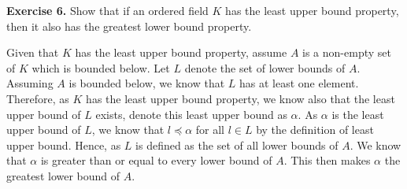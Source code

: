 \documentclass[11pt, leqno]{article}
\begin{document}
\vspace{1pc}

\textbf{Exercise 6.} Show that if an ordered field $K$ has the least upper bound property, then it also has the greatest lower bound property.

\vspace{1pc}

Given that $K$ has the least upper bound property, assume $A$ is a non-empty set of $K$ which is bounded below. Let $L$ denote the set of lower bounds of $A$. Assuming $A$ is bounded below, we know that $L$ has at least one element. Therefore, as $K$ has the least upper bound property, we know also that the least upper bound of $L$ exists, denote this least upper bound as $\alpha$. As $\alpha$ is the least upper bound of $L$, we know that $ l \preceq \alpha$ for all $l \in L$ by the definition of least upper bound. Hence, as $L$ is defined as the set of all lower bounds of $A$. We know that $\alpha$ is greater than or equal to every lower bound of $A$. This then makes $\alpha$ the greatest lower bound of $A$.
\end{document}
